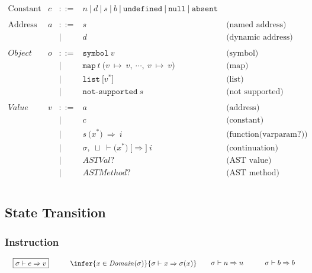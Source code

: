 \documentclass[11pt]{article}
\newcommand{\Term}[1]{\texttt{#1}}
\newcommand{\eval}[3]{#1\vdash #2\Rightarrow #3}
\newcommand{\evald}[2]{\eval{\sigma}{#1}{#2}}
\newcommand{\dom}[1]{\mathit{Domain}(#1)}
\newcommand{\cs}[0]{\quad}
\begin{document}
\[
\begin{array}{rrrll}
\text{Constant} & c & ::= & n\ |\ d\ |\ s\ |\ b\ |\
\Term{undefined}\ |\ \Term{null}\ |\ \Term{absent}\ & \\
\\
\text{Address} & a & ::= & s & \text{(named address)} \\
&&|& d & \text{(dynamic address)}\\
\\
\textit{Object} & o & ::= & \Term{symbol}\ v & \text{(symbol)}\\
&&|& \Term{map}\ t\ \Term{(} v\ \mapsto\ v,\ \cdots,\
v\ \mapsto\ v \Term{)} & \text{(map)}\\
&&|& \Term{list}\ \Term{[} v^* \Term{]} & \text{(list)}\\
&&|& \Term{not-supported}\ s & \text{(not supported)}\\
\\
\textit{Value} & v & ::= & a & \text{(address)} \\
&&|& c & \text{(constant)}\\
&&|& s\ \Term{(} x^* \Term{)}\ \Rightarrow\ i
& \text{(function(varparam?))}\\
&&|& \sigma,\ \sqcup\ \vdash \Term{(} x^* \Term{)}\
\Term{[} \Rightarrow \Term{]}\ i & \text{(continuation)}\\
&&|& ASTVal? & \text{(AST value)}\\
&&|& ASTMethod? & \text{(AST method)}\\
\\


\end{array}
\]

\newpage

\subsection{State Transition}

\subsubsection{Instruction}

\[
\begin{array}{ccc}
\multicolumn{1}{c}{\begin{array}{ccc}
\fbox{$\evald{e}{v}$}
&\cs&
\infer
{ x\in\dom{\sigma} }
{ \evald{x}{\sigma(x)} }
\end{array}}
&
\multicolumn{2}{c}{\begin{array}{ccc}
\evald{n}{n}
&\cs&
\evald{b}{b}
\end{array}}
\\
\end{array}
\]
\end{document}
